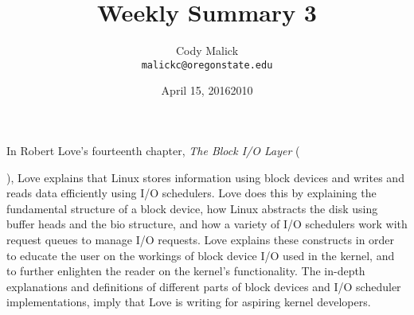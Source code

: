 \documentclass[10pt,letterpaper]{article}
\begin{document}
  \title{Weekly Summary 3}
  \author{Cody Malick\\
  \texttt{malickc@oregonstate.edu}}
  \date{April 15, 2016}
  \maketitle

    In Robert Love's fourteenth chapter, \textit{The Block I/O Layer}
    (\date{2010}), Love explains that Linux stores information using block
    devices and writes and reads data efficiently using I/O schedulers.
    Love does this by explaining the fundamental structure of a block device,
    how Linux abstracts the disk using buffer heads and the bio structure, and
    how a variety of I/O schedulers work with request queues to manage I/O requests.
    Love explains these constructs in order to educate the user on the workings
    of block device I/O used in the kernel, and to further enlighten the reader
    on the kernel's functionality.
    The in-depth
    explanations and definitions of different parts of block devices and
    I/O scheduler implementations, imply that Love is writing for aspiring
    kernel developers.
\end{document}
